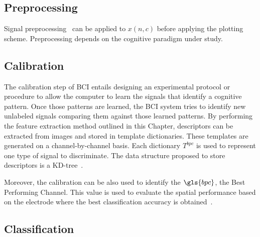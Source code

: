 \subsection{Preprocessing}

Signal preprocessing~\cite{Simons2016} can be applied to $x(n,c)$ before applying the plotting scheme.  Preprocessing depends on the cognitive paradigm under study.  

%

\subsection{Calibration}
\label{Calibration}

The calibration step of BCI entails designing an experimental protocol or procedure to allow the computer to learn the signals that identify a cognitive pattern.  Once those patterns are learned, the BCI system tries to identify new unlabeled signals comparing them against those learned patterns.  By performing the feature extraction method outlined in this Chapter, descriptors can be extracted from images and stored in template dictionaries.  These templates are generated on a channel-by-channel basis.  Each dictionary $T^{bpc}$ is used to represent one type of signal to discriminate. The data structure proposed to store descriptors is a KD-tree~\cite{Lowe2004}.

Moreover, the calibration can be also used to identify the $\gls{bpc}$, the Best Performing Channel. This value is used to evaluate the spatial performance based on the electrode where the best classification accuracy is obtained~\cite{Chavarriaga2017}.

\subsection{Classification}
\label{nbnn}

